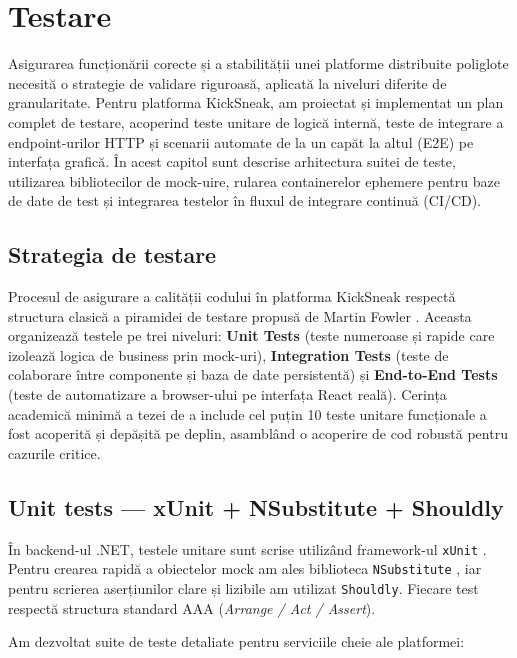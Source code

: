 \chapter{Testare}

Asigurarea funcționării corecte și a stabilității unei platforme distribuite poliglote necesită o strategie de validare riguroasă, aplicată la niveluri diferite de granularitate. Pentru platforma KickSneak, am proiectat și implementat un plan complet de testare, acoperind teste unitare de logică internă, teste de integrare a endpoint-urilor HTTP și scenarii automate de la un capăt la altul (E2E) pe interfața grafică. În acest capitol sunt descrise arhitectura suitei de teste, utilizarea bibliotecilor de mock-uire, rularea containerelor ephemere pentru baze de date de test și integrarea testelor în fluxul de integrare continuă (CI/CD).

\section{Strategia de testare}

Procesul de asigurare a calității codului în platforma KickSneak respectă structura clasică a piramidei de testare propusă de Martin Fowler \cite{fowler2026testing}. Aceasta organizează testele pe trei niveluri: \textbf{Unit Tests} (teste numeroase și rapide care izolează logica de business prin mock-uri), \textbf{Integration Tests} (teste de colaborare între componente și baza de date persistentă) și \textbf{End-to-End Tests} (teste de automatizare a browser-ului pe interfața React reală). Cerința academică minimă a tezei de a include cel puțin 10 teste unitare funcționale a fost acoperită și depășită pe deplin, asamblând o acoperire de cod robustă pentru cazurile critice.

\section{Unit tests --- xUnit + NSubstitute + Shouldly}

În backend-ul .NET, testele unitare sunt scrise utilizând framework-ul \texttt{xUnit} \cite{xunit2026docs}. Pentru crearea rapidă a obiectelor mock am ales biblioteca \texttt{NSubstitute} \cite{nsubstitute2026docs}, iar pentru scrierea aserțiunilor clare și lizibile am utilizat \texttt{Shouldly}. Fiecare test respectă structura standard AAA (\textit{Arrange / Act / Assert}).

Am dezvoltat suite de teste detaliate pentru serviciile cheie ale platformei:

